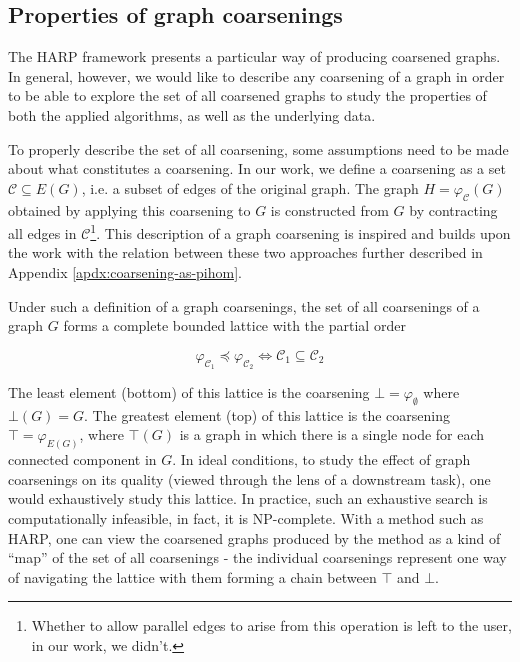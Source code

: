 \subsection{Properties of graph coarsenings}

The HARP framework presents a particular way of producing coarsened graphs. In general, however, we would like to describe any coarsening of a graph in order to be able to explore the set of all coarsened graphs to study the properties of both the applied algorithms, as well as the underlying data.

To properly describe the set of all coarsening, some assumptions need to be made about what constitutes a coarsening. In our work, we define a coarsening as a set \( \mathcal{C} \subseteq E \left( G \right) \), i.e. a subset of edges of the original graph. The graph \( H = \varphi_\mathcal{C} \left( G \right) \) obtained by applying this coarsening to \( G \) is constructed from \( G \) by contracting all edges in \( \mathcal{C} \)\footnote{Whether to allow parallel edges to arise from this operation is left to the user, in our work, we didn't.}. This description of a graph coarsening is inspired and builds upon the work \cite{schulz_mining_2019} with the relation between these two approaches further described in Appendix \ref{apdx:coarsening-as-pihom}.

Under such a definition of a graph coarsenings, the set of all coarsenings of a graph \( G \) forms a complete bounded lattice with the partial order

\[ \varphi_{\mathcal{C}_1} \preceq \varphi_{\mathcal{C}_2} \iff \mathcal{C}_1 \subseteq \mathcal{C}_2 \]

The least element (bottom) of this lattice is the coarsening \( \bot = \varphi_\emptyset \) where \( \bot \left( G \right) = G \). The greatest element (top) of this lattice is the coarsening \( \top = \varphi_{E \left( G \right)} \), where \( \top \left( G \right) \) is a graph in which there is a single node for each connected component in \( G \). In ideal conditions, to study the effect of graph coarsenings on its quality (viewed through the lens of a downstream task), one would exhaustively study this lattice. In practice, such an exhaustive search is computationally infeasible, in fact, it is NP-complete. With a method such as HARP, one can view the coarsened graphs produced by the method as a kind of \enquote{map} of the set of all coarsenings - the individual coarsenings represent one way of navigating the lattice with them forming a chain between \( \top \) and \( \bot \).

